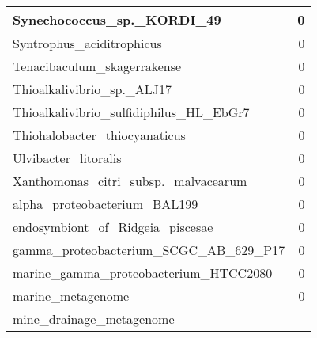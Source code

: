 \documentclass[12pt,a4paper]{article}
\begin{document}
\begin{table}[ht]
\begin{center}
\begin{tabular}{|l*{1}{|r}|}
Synechococcus\_sp.\_KORDI\_49 & 0 \\ \hline
Syntrophus\_aciditrophicus & 0 \\ \hline
Tenacibaculum\_skagerrakense & 0 \\ \hline
Thioalkalivibrio\_sp.\_ALJ17 & 0 \\ \hline
Thioalkalivibrio\_sulfidiphilus\_HL\_EbGr7 & 0 \\ \hline
Thiohalobacter\_thiocyanaticus & 0 \\ \hline
Ulvibacter\_litoralis & 0 \\ \hline
Xanthomonas\_citri\_subsp.\_malvacearum & 0 \\ \hline
alpha\_proteobacterium\_BAL199 & 0 \\ \hline
endosymbiont\_of\_Ridgeia\_piscesae & 0 \\ \hline
gamma\_proteobacterium\_SCGC\_AB\_629\_P17 & 0 \\ \hline
marine\_gamma\_proteobacterium\_HTCC2080 & 0 \\ \hline
marine\_metagenome & 0 \\ \hline
mine\_drainage\_metagenome & - \\ \hline
\end{tabular}
\end{center}
\end{table}
\end{document}
